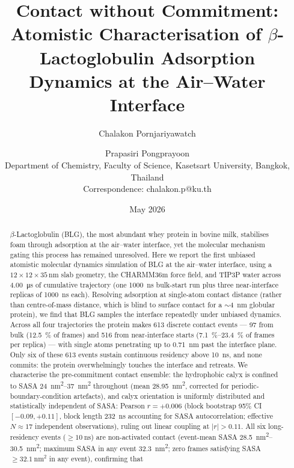 \documentclass[11pt,a4paper]{article}
\title{\large Contact without Commitment: Atomistic Characterisation of
       \boldmath$\beta$-Lactoglobulin Adsorption Dynamics at the Air--Water Interface}
\author{Chalakon Pornjariyawatch \and Prapasiri Pongprayoon\\[2pt]
        \small Department of Chemistry, Faculty of Science,
        Kasetsart University, Bangkok, Thailand\\
        \small Correspondence: chalakon.p@ku.th}
\date{May 2026}
\begin{document}
\maketitle

\begin{abstract}
\noindent
$\beta$-Lactoglobulin (BLG), the most abundant whey protein in bovine milk,
stabilises foam through adsorption at the air--water interface, yet the
molecular mechanism gating this process has remained unresolved. Here we
report the first unbiased atomistic molecular dynamics simulation of BLG
at the air--water interface, using a $12\times12\times35$\,\si{\nano\metre} slab
geometry, the CHARMM36m force field, and TIP3P water across
\SI{4.00}{\micro\second} of cumulative trajectory (one \SI{1000}{\nano\second}
bulk-start run plus three near-interface replicas of
\SI{1000}{\nano\second} each). Resolving adsorption at
single-atom contact distance (rather than centre-of-mass distance, which
is blind to surface contact for a $\sim$\SI{4}{\nano\metre} globular
protein), we find that BLG samples the interface repeatedly under
unbiased dynamics. Across all four trajectories the protein makes
\num{613} discrete contact events --- \num{97} from bulk (\SI{12.5}{\percent}
of frames) and \num{516} from near-interface starts
(\SIrange{7.1}{23.4}{\percent} of frames per replica) --- with single
atoms penetrating up to \SI{0.71}{\nano\metre} past the interface plane.
Only six of these \num{613} events sustain continuous residency
above \SI{10}{\nano\second}, and none commits: the protein
overwhelmingly touches the interface and retreats.
We characterise the pre-commitment contact ensemble: the hydrophobic
calyx is confined to SASA \SIrange{24}{37}{\nano\metre\squared}
throughout (mean \SI{28.95}{\nano\metre\squared}, corrected for
periodic-boundary-condition artefacts), and calyx orientation is
uniformly distributed and statistically independent of SASA:
Pearson $r = +0.006$ (block bootstrap 95\% CI $[-0.09, +0.11]$, block
length \SI{232}{\nano\second} accounting for SASA autocorrelation;
effective $N \approx 17$ independent observations), ruling out linear
coupling at $|r| > 0.11$.
All six long-residency events ($\geq\!\SI{10}{\nano\second}$) are
non-activated contact (event-mean SASA \SIrange{28.5}{30.5}{\nano\metre\squared};
maximum SASA in any event \SI{32.3}{\nano\metre\squared}; zero frames
satisfying SASA $\geq \SI{32.1}{\nano\metre\squared}$ in any event), confirming that

\end{abstract}
\end{document}
